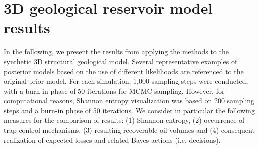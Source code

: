 		\section{3D geological reservoir model results}
		In the following, we present the results from applying the methods to the synthetic 3D structural geological model. Several representative examples of posterior models based on the use of different likelihoods are referenced to the original prior model. For each simulation, 1,000 sampling steps were conducted, with a burn-in phase of 50 iterations for MCMC sampling. However, for computational reasons, Shannon entropy visualization was based on 200 sampling steps and a burn-in phase of 50 iterations. We consider in particular the following measures for the comparison of results: (1) Shannon entropy, (2) occurrence of trap control mechanisms, (3) resulting recoverable oil volumes and (4) consequent realization of expected losses and related Bayes actions (i.e. decisions).
		
